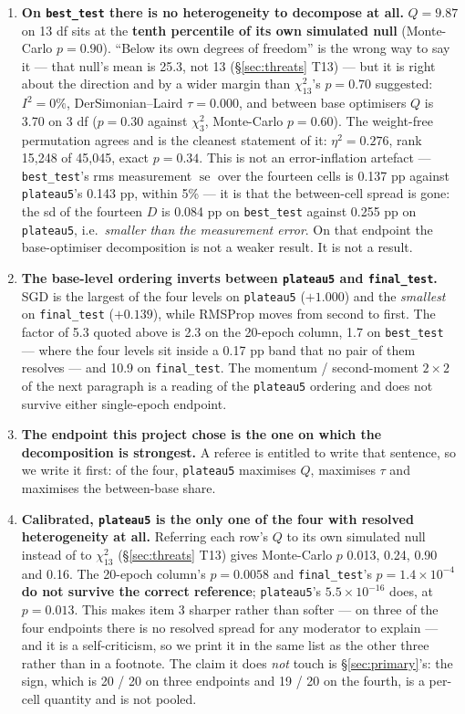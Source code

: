 \documentclass[10pt,letterpaper]{article}
\newcommand{\Dstat}{D}                         %
\newcommand{\plateau}{\texttt{plateau5}}
\DeclareMathOperator{\se}{se}
\begin{document}
\begin{enumerate}
\item \textbf{On \texttt{best\_test} there is no heterogeneity to decompose at all.} $Q = 9.87$
  on 13 df sits at the \textbf{tenth percentile of its own simulated null} (Monte-Carlo
  $p = 0.90$). ``Below its own degrees of freedom'' is the wrong way to say it --- that null's
  mean is 25.3, not 13 (\S\ref{sec:threats} T13) --- but it is right about the direction and by
  a wider margin than $\chi^2_{13}$'s $p = 0.70$ suggested: $I^2 = 0\%$, DerSimonian--Laird
  $\tau = 0.000$, and between base optimisers $Q$ is 3.70 on 3 df ($p = 0.30$ against $\chi^2_3$,
  Monte-Carlo $p = 0.60$). The weight-free permutation agrees and is the cleanest statement of it:
  $\eta^2 = 0.276$, rank 15{,}248 of 45{,}045, exact $p = 0.34$. This is not an
  error-inflation artefact --- \texttt{best\_test}'s rms measurement $\se$ over the fourteen cells
  is 0.137 pp against \plateau{}'s 0.143 pp, within 5\% --- it is that the between-cell spread is
  gone: the sd of the fourteen $\Dstat$ is 0.084 pp on \texttt{best\_test} against 0.255 pp on
  \plateau{}, i.e.\ \emph{smaller than the measurement error}. On that endpoint the base-optimiser
  decomposition is not a weaker result. It is not a result.
\item \textbf{The base-level ordering inverts between \plateau{} and \texttt{final\_test}.} SGD is
  the largest of the four levels on \plateau{} ($+1.000$) and the \emph{smallest} on
  \texttt{final\_test} ($+0.139$), while RMSProp moves from second to first. The factor of 5.3
  quoted above is 2.3 on the 20-epoch column, 1.7 on \texttt{best\_test} --- where the four levels
  sit inside a 0.17 pp band that no pair of them resolves --- and 10.9 on \texttt{final\_test}.
  The momentum / second-moment $2 \times 2$ of the next paragraph is a reading of the \plateau{}
  ordering and does not survive either single-epoch endpoint.
\item \textbf{The endpoint this project chose is the one on which the decomposition is
  strongest.} A referee is entitled to write that sentence, so we write it first: of the four,
  \plateau{} maximises $Q$, maximises $\tau$ and maximises the between-base share.
\item \textbf{Calibrated, \plateau{} is the only one of the four with resolved heterogeneity at
  all.} Referring each row's $Q$ to its own simulated null instead of to $\chi^2_{13}$
  (\S\ref{sec:threats} T13) gives Monte-Carlo $p$ 0.013, 0.24, 0.90 and 0.16. The 20-epoch
  column's $p = 0.0058$ and \texttt{final\_test}'s $p = 1.4\times10^{-4}$ \textbf{do not
  survive the correct reference}; \plateau{}'s $5.5\times10^{-16}$ does, at $p = 0.013$. This
  makes item 3 sharper rather than softer --- on three of the four endpoints there is no resolved
  spread for any moderator to explain --- and it is a self-criticism, so we print it in the same
  list as the other three rather than in a footnote. The claim it does \emph{not} touch is
  \S\ref{sec:primary}'s: the sign, which is 20 / 20 on three endpoints and 19 / 20 on the
  fourth, is a per-cell quantity and is not pooled.
\end{enumerate}
\end{document}
